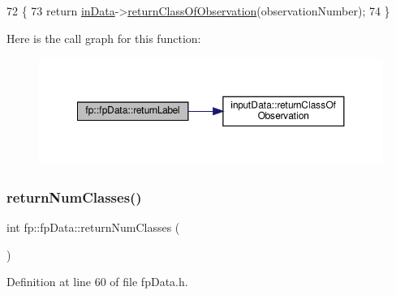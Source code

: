 \begin{DoxyCode}
72                                                          \{
73                 \textcolor{keywordflow}{return} \hyperlink{classfp_1_1fpData_a49d7c3f58bcf88843c25b1b0c9714ebe}{inData}->\hyperlink{classinputData_ab6ba59207888898f9c008578dd59cf46}{returnClassOfObservation}(observationNumber);
74             \}
\end{DoxyCode}
Here is the call graph for this function\+:\nopagebreak
\begin{figure}[H]
\begin{center}
\leavevmode
\includegraphics[width=350pt]{classfp_1_1fpData_aac722f51424cb7f6ab7d89525f82cc72_cgraph}
\end{center}
\end{figure}
\mbox{\label{classfp_1_1fpData_a7abfc93af30b7262d59b6d304796a09d}} 
\subsubsection{\texorpdfstring{return\+Num\+Classes()}{returnNumClasses()}}
{\footnotesize\ttfamily int fp\+::fp\+Data\+::return\+Num\+Classes (\begin{DoxyParamCaption}{ }\end{DoxyParamCaption})\hspace{0.3cm}{\ttfamily [inline]}}



Definition at line 60 of file fp\+Data.\+h.



